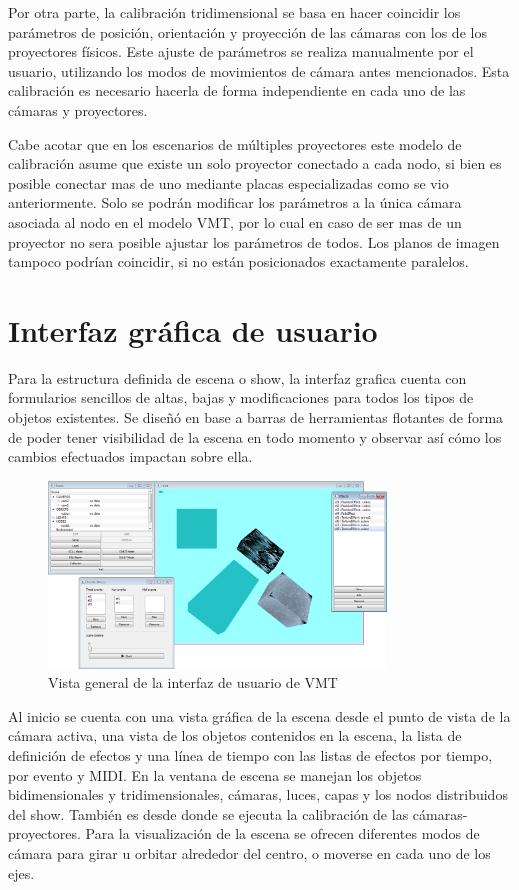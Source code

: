 Por otra parte, la calibración tridimensional se basa en hacer coincidir los parámetros de posición, orientación y proyección de las cámaras con los de los proyectores físicos. Este ajuste de parámetros se realiza manualmente por el usuario, utilizando los modos de movimientos de cámara antes mencionados. Esta calibración es necesario hacerla de forma independiente en cada uno de las cámaras y proyectores.

Cabe acotar que en los escenarios de múltiples proyectores este modelo de calibración asume que existe un solo proyector conectado a cada nodo, si bien es posible conectar mas de uno mediante placas especializadas como se vio anteriormente. Solo se podrán modificar los parámetros a la única cámara asociada al nodo en el modelo VMT, por lo cual en caso de ser mas de un proyector no sera posible ajustar los parámetros de todos. Los planos de imagen tampoco podrían coincidir, si no están posicionados exactamente paralelos.


\section{Interfaz gráfica de usuario}

Para la estructura definida de escena o show, la interfaz grafica cuenta con formularios sencillos de altas, bajas y modificaciones para todos los tipos de objetos existentes. Se diseñó en base a barras de herramientas flotantes de forma de poder tener visibilidad de la escena en todo momento y observar así cómo los cambios efectuados impactan sobre ella.

\begin{figure}[H]
  \centering
    \includegraphics[width=0.8\textwidth]{./Cap5_vmt/vmt_todo.png}
  \caption{Vista general de la interfaz de usuario de VMT}
  \label{fig:VMT-MainWindow}
\end{figure}

Al inicio se cuenta con una vista gráfica de la escena desde el punto de vista de la cámara activa, una vista de los objetos contenidos en la escena, la lista de definición de efectos y una línea de tiempo con las listas de efectos por tiempo, por evento y MIDI.
En la ventana de escena se manejan los objetos bidimensionales y tridimensionales, cámaras, luces, capas y los nodos distribuidos del show. También es desde donde se ejecuta la calibración de las cámaras-proyectores. Para la visualización de la escena se ofrecen diferentes modos de cámara para girar u orbitar alrededor del centro, o moverse en cada uno de los ejes.

